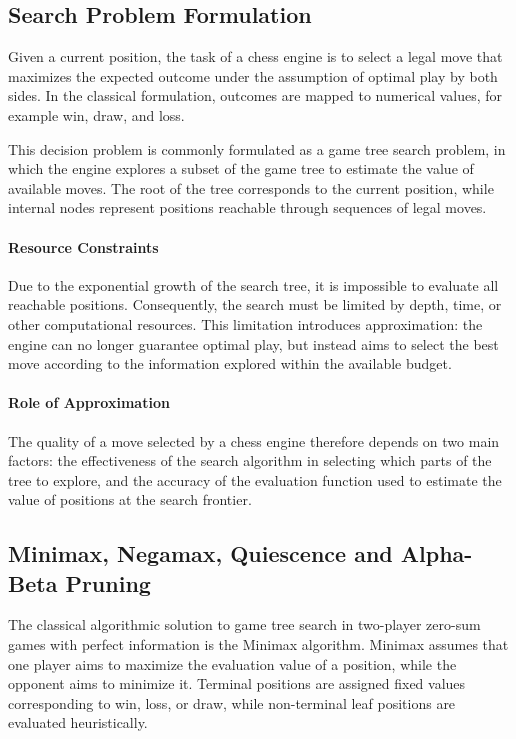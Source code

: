 \subsection{Search Problem Formulation}

Given a current position, the task of a chess engine is to select a legal move
that maximizes the expected outcome under the assumption of optimal play by both
sides. In the classical formulation, outcomes are mapped to numerical values,
for example win, draw, and loss.

This decision problem is commonly formulated as a game tree search problem, in
which the engine explores a subset of the game tree to estimate the value of
available moves. The root of the tree corresponds to the current position, while
internal nodes represent positions reachable through sequences of legal moves.

\paragraph{Resource Constraints}
Due to the exponential growth of the search tree, it is impossible to evaluate
all reachable positions. Consequently, the search must be limited by depth,
time, or other computational resources. This limitation introduces approximation:
the engine can no longer guarantee optimal play, but instead aims to select the
best move according to the information explored within the available budget.

\paragraph{Role of Approximation}
The quality of a move selected by a chess engine therefore depends on two main
factors: the effectiveness of the search algorithm in selecting which parts of
the tree to explore, and the accuracy of the evaluation function used to estimate
the value of positions at the search frontier.

\subsection{Minimax, Negamax, Quiescence and Alpha-Beta Pruning}
\label{subsec:minimax_alphabeta}

The classical algorithmic solution to game tree search in two-player zero-sum
games with perfect information is the Minimax algorithm. Minimax assumes that
one player aims to maximize the evaluation value of a position, while the
opponent aims to minimize it. Terminal positions are assigned fixed values
corresponding to win, loss, or draw, while non-terminal leaf positions are
evaluated heuristically.


